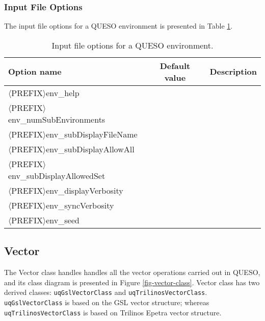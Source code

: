 \subsubsection{Input File Options}
The input file options for a QUESO environment is presented in Table \ref{tab-env-options}.
\begin{table}[!h]
\begin{center}
\caption{Input file options for a QUESO environment.}\label{tab-env-options}
\ttfamily
\begin{tabular}{l|c|c}
\toprule
\rmfamily Option name                      & \rmfamily Default  value &\rmfamily Description \\
\midrule\midrule

$\langle$PREFIX$\rangle$env\_help                 &         &             \\

$\langle$PREFIX$\rangle$env\_numSubEnvironments   &         &             \\

$\langle$PREFIX$\rangle$env\_subDisplayFileName   &         &             \\

$\langle$PREFIX$\rangle$env\_subDisplayAllowAll   &         &             \\

$\langle$PREFIX$\rangle$env\_subDisplayAllowedSet &         &             \\

$\langle$PREFIX$\rangle$env\_displayVerbosity     &         &             \\

$\langle$PREFIX$\rangle$env\_syncVerbosity        &         &             \\

$\langle$PREFIX$\rangle$env\_seed                 &         &             \\
\bottomrule
\end{tabular}
\end{center}
\end{table}



\subsection{Vector}


The Vector class handles handles all the vector operations carried out in QUESO, and its class diagram is presented in Figure \ref{fig-vector-class}.
Vector class has two derived classes: \verb+uqGslVectorClass+ and \verb+uqTrilinosVectorClass+. \verb+uqGslVectorClass+ is based on the GSL vector structure; whereas \verb+uqTrilinosVectorClass+ is based on Trilinos Epetra vector structure.


